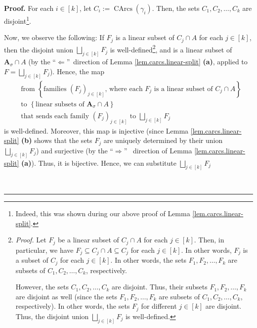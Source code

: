 \documentclass[numbers=enddot,12pt,final,onecolumn,notitlepage]{scrartcl}%
\numberwithin{exer}{section}
\theoremstyle{definition}
\newenvironment{proof}[1][Proof]{\noindent\textbf{#1.} }{\ \rule{0.5em}{0.5em}}
\let\sqcupnonlimits\bigsqcup
\renewcommand{\bigsqcup}{\sqcupnonlimits\limits}
\newenvironment{verlong}{}{}
\begin{document}
\begin{verlong}
\begin{proof}
For each $i\in\left[  k\right]  $, let $C_{i}:=\operatorname*{CArcs}\left(
\gamma_{i}\right)  $. Then, the sets $C_{1},C_{2},\ldots,C_{k}$ are
disjoint\footnote{Indeed, this was shown during our above proof of Lemma
\ref{lem.carcs.linear-split}.}.

Now, we observe the following: If $F_{j}$ is a linear subset of $C_{j}\cap A$
for each $j\in\left[  k\right]  $, then the disjoint union $\bigsqcup
_{j\in\left[  k\right]  }F_{j}$ is well-defined\footnote{\textit{Proof.} Let
$F_{j}$ be a linear subset of $C_{j}\cap A$ for each $j\in\left[  k\right]  $.
Then, in particular, we have $F_{j}\subseteq C_{j}\cap A\subseteq C_{j}$ for
each $j\in\left[  k\right]  $. In other words, $F_{j}$ is a subset of $C_{j}$
for each $j\in\left[  k\right]  $. In other words, the sets $F_{1}%
,F_{2},\ldots,F_{k}$ are subsets of $C_{1},C_{2},\ldots,C_{k}$, respectively.
\par
However, the sets $C_{1},C_{2},\ldots,C_{k}$ are disjoint. Thus, their subsets
$F_{1},F_{2},\ldots,F_{k}$ are disjoint as well (since the sets $F_{1}%
,F_{2},\ldots,F_{k}$ are subsets of $C_{1},C_{2},\ldots,C_{k}$, respectively).
In other words, the sets $F_{j}$ for different $j\in\left[  k\right]  $ are
disjoint. Thus, the disjoint union $\bigsqcup_{j\in\left[  k\right]  }F_{j}$
is well-defined.}, and is a linear subset of $\mathbf{A}_{\sigma}\cap A$ (by
the \textquotedblleft$\Longleftarrow$\textquotedblright\ direction of Lemma
\ref{lem.carcs.linear-split} \textbf{(a)}, applied to $F=\bigsqcup
_{j\in\left[  k\right]  }F_{j}$). Hence, the map%
\begin{align*}
&  \text{from }\left\{  \text{families }\left(  F_{j}\right)  _{j\in\left[
k\right]  }\text{, where each }F_{j}\text{ is a linear subset of }C_{j}\cap
A\right\} \\
&  \text{to }\left\{  \text{linear subsets of }\mathbf{A}_{\sigma}\cap
A\right\} \\
&  \text{that sends each family }\left(  F_{j}\right)  _{j\in\left[  k\right]
}\text{ to }\bigsqcup_{j\in\left[  k\right]  }F_{j}%
\end{align*}
is well-defined. Moreover, this map is injective (since Lemma
\ref{lem.carcs.linear-split} \textbf{(b)} shows that the sets $F_{j}$ are
uniquely determined by their union $\bigsqcup_{j\in\left[  k\right]  }F_{j}$)
and surjective (by the \textquotedblleft$\Longrightarrow$\textquotedblright%
\ direction of Lemma \ref{lem.carcs.linear-split} \textbf{(a)}). Thus, it is
bijective. Hence, we can substitute $\bigsqcup_{j\in\left[  k\right]  }F_{j}$

\end{proof}
\end{verlong}
\end{document}
